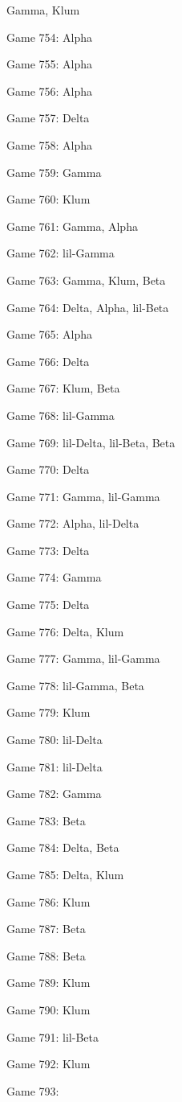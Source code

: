 \documentclass{article}
\begin{document}
\begin{multicols}{3}
\begin{compactitem}
Gamma, Klum
\item Game 754:
Alpha
\item Game 755:
Alpha
\item Game 756:
Alpha
\item Game 757:
Delta
\item Game 758:
Alpha
\item Game 759:
Gamma
\item Game 760:
Klum
\item Game 761:
Gamma, Alpha
\item Game 762:
lil-Gamma
\item Game 763:
Gamma, Klum, Beta
\item Game 764:
Delta, Alpha, lil-Beta
\item Game 765:
Alpha
\item Game 766:
Delta
\item Game 767:
Klum, Beta
\item Game 768:
lil-Gamma
\item Game 769:
lil-Delta, lil-Beta, Beta
\item Game 770:
Delta
\item Game 771:
Gamma, lil-Gamma
\item Game 772:
Alpha, lil-Delta
\item Game 773:
Delta
\item Game 774:
Gamma
\item Game 775:
Delta
\item Game 776:
Delta, Klum
\item Game 777:
Gamma, lil-Gamma
\item Game 778:
lil-Gamma, Beta
\item Game 779:
Klum
\item Game 780:
lil-Delta
\item Game 781:
lil-Delta
\item Game 782:
Gamma
\item Game 783:
Beta
\item Game 784:
Delta, Beta
\item Game 785:
Delta, Klum
\item Game 786:
Klum
\item Game 787:
Beta
\item Game 788:
Beta
\item Game 789:
Klum
\item Game 790:
Klum
\item Game 791:
lil-Beta
\item Game 792:
Klum
\item Game 793:

\end{compactitem}
\end{multicols}
\end{document}
